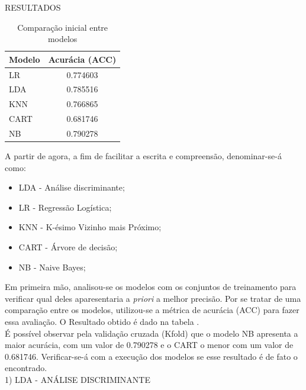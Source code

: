 
\noindent \textcolor{COLOR2}{RESULTADOS}
\\

\begin{table}[ht]
    \label{tab:resultados}
    \centering
    \begin{tabular}{lc}
        \rowcolor{pagecolor!50!COLOR1}
        \hline
        Modelo & Acurácia (ACC) \\\hline\hline
        LR     & 0.774603       \\\hline
        LDA    & 0.785516       \\\hline
        KNN    & 0.766865       \\\hline
        CART   & 0.681746       \\\hline
        NB     & 0.790278
    \end{tabular}
    \caption{Comparação inicial entre modelos}
\end{table}

A partir de agora, a fim de facilitar a escrita e compreensão, denominar-se-á como:

\begin{itemize}
    \item \textcolor{deepblue}{LDA} - Análise discriminante;
    \item \textcolor{deepblue}{LR} - Regressão Logística;
    \item \textcolor{deepblue}{KNN} - K-ésimo Vizinho mais Próximo;
    \item \textcolor{deepblue}{CART} - Árvore de decisão;
    \item \textcolor{deepblue}{NB} - Naive Bayes;
\end{itemize}

Em primeira mão, analisou-se os modelos com os conjuntos de treinamento para verificar qual deles aparesentaria a \textit{priori} a melhor precisão. Por se tratar de uma comparação entre os modelos, utilizou-se a métrica de acurácia (ACC) para fazer essa avaliação. O Resultado obtido é dado na tabela \pageref{tab:resultados}.\\

É possível observar pela validação cruzada (Kfold) que o modelo NB apresenta a maior acurácia, com um valor de 0.790278 e o CART o menor com um valor de 0.681746. Verificar-se-á com a execução dos modelos se esse resultado é de fato o encontrado.
\\

\noindent \textcolor{deepblue}{1) LDA - ANÁLISE DISCRIMINANTE}

